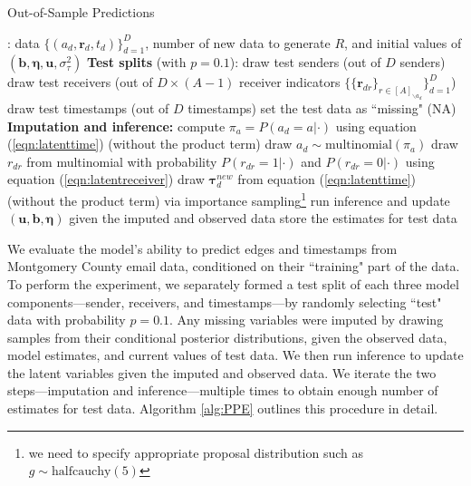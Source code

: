 \documentclass[ba]{imsart}
\def\spacingset#1{\renewcommand{\baselinestretch}%
	{#1}\small\normalsize} \spacingset{1}
\numberwithin{equation}{section}
\theoremstyle{plain}
\begin{document}
	\begin{algorithm}[!t]
		\spacingset{1}
		\caption{Out-of-Sample Predictions}
		\label{alg:PPE}
		\begin{algorithmic}
			: data $ \{ (a_d, \boldsymbol{r}_d, t_d)\}_{d=1}^D$, 
			number of new data to generate $R$, and initial values of $(\boldsymbol{b}, \boldsymbol{\eta}, \boldsymbol{u}, \sigma^2_\tau)$
			\vskip 0.1in
			\textbf{Test splits} (with $p=0.1$):	
			\STATE draw test senders (out of $D$ senders) 
			\STATE draw test receivers (out of $D\times (A-1)$ receiver indicators $\{\{\boldsymbol{r}_{dr}\}_{r\in [A]_{\backslash a_d}}\}_{d=1}^D$)
			\STATE draw test timestamps  (out of $D$ timestamps) 
			\STATE set the test data as ``missing" (NA)
			\vskip 0.1in
			\textbf{Imputation and inference:}	
			\STATE compute $\pi_{a}=P(a_d= a | \cdot)$ using equation (\ref{eqn:latenttime}) (without the product term)
			\ENDFOR
			\STATE draw $a_d \sim \mbox{multinomial}(\pi_a)$
			\ENDIF
			\STATE draw $r_{dr}$ from multinomial with probability $P(r_{dr}= 1 | \cdot)$ and $P(r_{dr}= 0| \cdot)$ using equation (\ref{eqn:latentreceiver})
			\ENDIF
			\ENDFOR
			\STATE draw $\boldsymbol{\tau}^{new}_d$ from equation (\ref{eqn:latenttime}) (without the product term) via importance sampling\footnote{we need to specify appropriate proposal distribution such as $g \sim \mbox{halfcauchy}(5)$}
			\ENDIF
			\STATE run inference and update $(\boldsymbol{u},\boldsymbol{b}, \boldsymbol{\eta})$ given the imputed and observed data
			\ENDFOR
			\STATE store the estimates for test data
			\ENDFOR
		\end{algorithmic}
	\end{algorithm}
	
	We evaluate the model's ability to predict edges and timestamps from Montgomery County email data, conditioned on their ``training" part of the data. To perform the experiment, we separately formed a test split of each three model components---sender, receivers, and timestamps---by randomly selecting ``test" data with probability $p=0.1$. Any missing variables were imputed by drawing samples from their conditional posterior distributions, given the observed data, model estimates, and current values of test data. We then run inference to update the latent variables given the imputed and observed data. We iterate the two steps---imputation and inference---multiple times to obtain enough number of estimates for test data. Algorithm \ref{alg:PPE} outlines this procedure in detail. 
	
\end{document}
